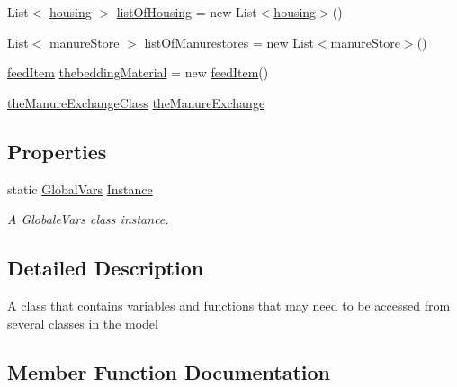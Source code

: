 \begin{DoxyCompactItemize}
\item 
List$<$ \mbox{\hyperlink{classhousing}{housing}} $>$ \mbox{\hyperlink{class_global_vars_aeba83240bfe09b5b7c59185674f232b6}{list\+Of\+Housing}} = new List$<$\mbox{\hyperlink{classhousing}{housing}}$>$()
\item 
List$<$ \mbox{\hyperlink{classmanure_store}{manure\+Store}} $>$ \mbox{\hyperlink{class_global_vars_a87f4d7b7be35a15d8f7a7b02eff17435}{list\+Of\+Manurestores}} = new List$<$\mbox{\hyperlink{classmanure_store}{manure\+Store}}$>$()
\item 
\mbox{\hyperlink{classfeed_item}{feed\+Item}} \mbox{\hyperlink{class_global_vars_ac5b724d8af7c0aa33718a1ed78fdfb8e}{thebedding\+Material}} = new \mbox{\hyperlink{classfeed_item}{feed\+Item}}()
\item 
\mbox{\hyperlink{class_global_vars_1_1the_manure_exchange_class}{the\+Manure\+Exchange\+Class}} \mbox{\hyperlink{class_global_vars_ac914a91c129f5e72dd711864e8aea1f8}{the\+Manure\+Exchange}}
\end{DoxyCompactItemize}
\subsection*{Properties}
\begin{DoxyCompactItemize}
\item 
static \mbox{\hyperlink{class_global_vars}{Global\+Vars}} \mbox{\hyperlink{class_global_vars_ab848514ffc2a60c2c1642ff113f4293d}{Instance}}
\begin{DoxyCompactList}\small\item\em A Globale\+Vars class instance. \end{DoxyCompactList}\end{DoxyCompactItemize}


\subsection{Detailed Description}
A class that contains variables and functions that may need to be accessed from several classes in the model 

\subsection{Member Function Documentation}
\mbox{\label{class_global_vars_ab89dab6808de1b3cf7dea479146f6865}} 
